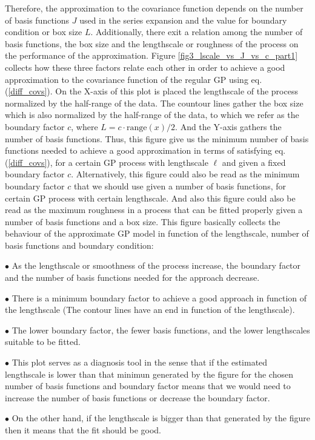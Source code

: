 \documentclass[]{interact}
\theoremstyle{plain}%
\theoremstyle{definition}
\theoremstyle{remark}
\begin{document}
Therefore, the approximation to the covariance function depends on the number of basis functions $J$ used in the series expansion and the value for boundary condition or box size $L$. Additionally, there exit a relation among the number of basis functions, the box size and the lengthscale or roughness of the process on the performance of the approximation. Figure \ref{fig3_lscale_vs_J_vs_c_part1} collects how these three factors relate each other in order to achieve a good approximation to the covariance function of the regular GP using eq. (\ref{diff_covs}). On the X-axis of this plot is placed the lengthscale of the process normalized by the half-range of the data. The countour lines gather the box size which is also normalized by the half-range of the data, to which we refer as the boundary factor $c$, where $L=c \cdot \text{range}(x)/2$. And the Y-axis gathers the number of basis functions. Thus, this figure give us the minimum number of basis functions needed to achieve a good approximation in terms of satisfying eq. (\ref{diff_covs}), for a certain GP process with lengthscale $\ell$ and given a fixed boundary factor $c$. Alternatively, this figure could also be read as the minimum boundary factor $c$ that we should use given a number of basis functions, for certain GP process with certain lengthscale. And also this figure could also be read as the maximum roughness in a process that can be fitted properly given a number of basis functions and a box size. This figure basically collects the behaviour of the approximate GP model in function of the lengthscale, number of basis functions and boundary condition:

$\bullet$ As the lengthscale or smoothness of the process increase, the boundary factor and the number of basis functions needed for the approach decrease.

$\bullet$ There is a minimum boundary factor to achieve a good approach in function of the lengthscale (The contour lines have an end in function of the lengthscale).

$\bullet$ The lower boundary factor, the fewer basis functions, and the lower lengthscales suitable to be fitted. 

$\bullet$ This plot serves as a diagnosis tool in the sense that if the estimated lengthscale is lower than that minimun generated by the figure for the chosen number of basis functions and boundary factor means that we would need to increase the number of basis functions or decrease the boundary factor.

$\bullet$ On the other hand, if the lengthscale is bigger than that generated by the figure then it means that the fit should be good.
\end{document}
